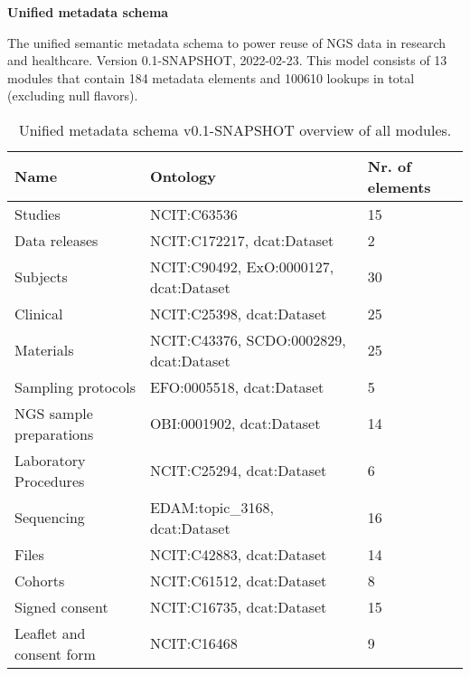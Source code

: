 \documentclass{article}
\begin{document}
\setlength\parindent{0pt}

\textbf{Unified metadata schema}
\newline

The unified semantic metadata schema to power reuse of NGS data in research and healthcare. Version 0.1-SNAPSHOT, 2022-02-23. This model consists of 13 modules that contain 184 metadata elements and 100610 lookups in total (excluding null flavors).

\begin{table}[htb]
\begin{tabular}{lll}
Name & Ontology & Nr. of elements \\
\hline
Studies & NCIT:C63536  & 15 \\
Data releases & NCIT:C172217, dcat:Dataset  & 2 \\
Subjects & NCIT:C90492, ExO:0000127, dcat:Dataset  & 30 \\
Clinical & NCIT:C25398, dcat:Dataset  & 25 \\
Materials & NCIT:C43376, SCDO:0002829, dcat:Dataset  & 25 \\
Sampling protocols & EFO:0005518, dcat:Dataset  & 5 \\
NGS sample preparations & OBI:0001902, dcat:Dataset  & 14 \\
Laboratory Procedures & NCIT:C25294, dcat:Dataset  & 6 \\
Sequencing & EDAM:topic\_3168, dcat:Dataset  & 16 \\
Files & NCIT:C42883, dcat:Dataset  & 14 \\
Cohorts & NCIT:C61512, dcat:Dataset  & 8 \\
Signed consent & NCIT:C16735, dcat:Dataset  & 15 \\
Leaflet and consent form & NCIT:C16468  & 9 \\
\hline
\end{tabular}
\caption[Module overview]{\label{table:table1} Unified metadata schema v0.1-SNAPSHOT overview of all modules.}
\end{table}
\end{document}
